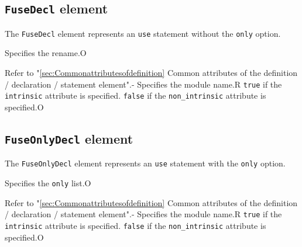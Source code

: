 \subsection{ {\tt FuseDecl} element}

The {\tt FuseDecl} element represents an {\tt use} statement without the {\tt only} option.


\begin{XcodeMLChildElements}
{Specifies the rename.}{O}
\end{XcodeMLChildElements}

\begin{XcodeMLAttributes}
{Refer to "\ref{sec:Commonattributesofdefinition} Common attributes of the definition / declaration / statement element".}{-}
{Specifies the module name.}{R}
{{\tt true} if the {\tt intrinsic} attribute is specified.
 {\tt false} if the {\tt non\_intrinsic} attribute is specified.}{O}
\end{XcodeMLAttributes}


\subsection{ {\tt FuseOnlyDecl} element}

The {\tt FuseOnlyDecl} element represents an {\tt use} statement with the {\tt only} option.


\begin{XcodeMLChildElements}
{Specifies the {\tt only} list.}{O}
\end{XcodeMLChildElements}

\begin{XcodeMLAttributes}
{Refer to "\ref{sec:Commonattributesofdefinition} Common attributes of the definition / declaration / statement element".}{-}
{Specifies the module name.}{R}
{{\tt true} if the {\tt intrinsic} attribute is specified.
 {\tt false} if the {\tt non\_intrinsic} attribute is specified.}{O}
\end{XcodeMLAttributes}


